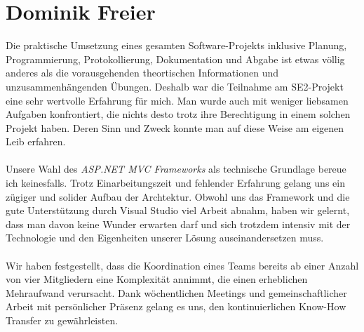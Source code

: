 	\section{Dominik Freier}
	Die praktische Umsetzung eines gesamten Software-Projekts inklusive Planung, Programmierung, Protokollierung, Dokumentation und Abgabe ist etwas völlig anderes als die vorausgehenden theortischen Informationen und unzusammenhängenden Übungen. Deshalb war die Teilnahme am SE2-Projekt eine sehr wertvolle Erfahrung für mich. Man wurde auch mit weniger liebsamen Aufgaben konfrontiert, die nichts desto trotz ihre Berechtigung in einem solchen Projekt haben. Deren Sinn und Zweck konnte man auf diese Weise am eigenen Leib erfahren.\\ \\
	Unsere Wahl des \textit{ASP.NET MVC Frameworks} als technische Grundlage bereue ich keinesfalls. Trotz Einarbeitungszeit und fehlender Erfahrung gelang uns ein zügiger und solider Aufbau der Archtektur. Obwohl uns das Framework und die gute Unterstützung durch Visual Studio  viel Arbeit abnahm, haben wir gelernt, dass man davon keine Wunder erwarten darf und sich trotzdem intensiv mit der Technologie und den Eigenheiten unserer Lösung auseinandersetzen muss.\\ \\
	Wir haben festgestellt, dass die Koordination eines Teams bereits ab einer Anzahl von vier Mitgliedern eine Komplexität annimmt,  die einen erheblichen Mehraufwand verursacht. Dank wöchentlichen Meetings und gemeinschaftlicher Arbeit mit persönlicher Präsenz gelang es uns, den kontinuierlichen Know-How Transfer zu gewährleisten. 